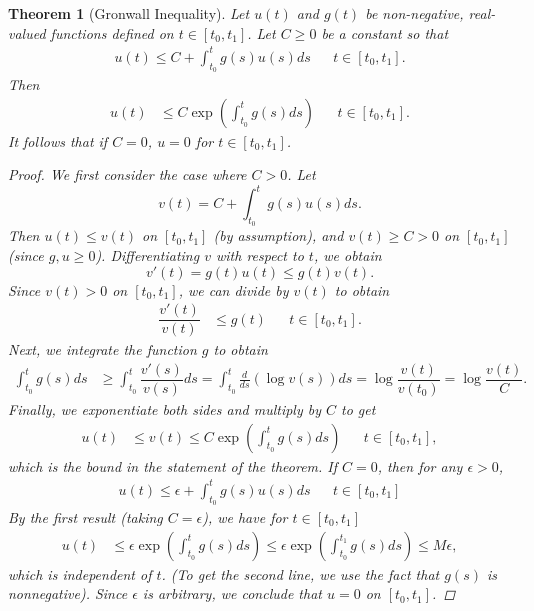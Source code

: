 \documentclass[12pt]{amsart}         %
\newtheorem{theorem}{Theorem}[section]
\theoremstyle{remark}
\begin{document}
\begin{theorem}[Gronwall Inequality]
Let $u(t)$ and $g(t)$ be non-negative, real-valued functions defined on $t \in [t_0, t_1]$. Let $C \geq 0$ be a constant so that
\begin{align*}
u(t) \leq C + \int_{t_0}^t g(s) u(s) ds && t \in [t_0, t_1].
\end{align*}
Then
\begin{align*}
u(t) &\leq C \exp \left( \int_{t_0}^t g(s) ds \right) && t \in [t_0, t_1].
\end{align*}
It follows that if $C = 0$, $u = 0$ for $t \in [t_0, t_1]$.
\begin{proof}
We first consider the case where $C > 0$. Let
\[
v(t) = C + \int_{t_0}^t g(s) u(s) ds.
\]
Then $u(t) \leq v(t)$ on $[t_0, t_1]$ (by assumption), and $v(t) \geq C > 0$ on $[t_0, t_1]$ (since $g, u \geq 0$). Differentiating $v$ with respect to $t$, we obtain
\[
v'(t) = g(t) u(t) \leq g(t)v(t).
\] 
Since $v(t) > 0$ on $[t_0, t_1]$, we can divide by $v(t)$ to obtain
\begin{align*}
\dfrac{v'(t)}{v(t)} &\leq g(t) && t \in [t_0, t_1].
\end{align*}
Next, we integrate the function $g$ to obtain
\begin{align*}
\int_{t_0}^t g(s) ds &\geq \int_{t_0}^t \dfrac{v'(s)}{v(s)} ds
= \int_{t_0}^t \frac{d}{ds}\left( \log {v(s)} \right) ds
= \log\dfrac{v(t)}{v(t_0)}
= \log\dfrac{v(t)}{C}.
\end{align*}
Finally, we exponentiate both sides and multiply by $C$ to get
\begin{align*}
u(t) &\leq v(t) \leq C \exp \left( \int_{t_0}^t g(s) ds \right) && t \in [t_0, t_1],
\end{align*}
which is the bound in the statement of the theorem.
If $C = 0$, then for any $\epsilon > 0$,
\begin{align*}
u(t) \leq \epsilon + \int_{t_0}^t g(s) u(s) ds && t \in [t_0, t_1]
\end{align*}
By the first result (taking $C = \epsilon$), we have for $t \in [t_0, t_1]$
\begin{align*}
u(t) &\leq \epsilon \exp \left( \int_{t_0}^t g(s) ds \right) \leq \epsilon \exp \left( \int_{t_0}^{t_1} g(s) ds \right) \leq M \epsilon,
\end{align*}
which is independent of $t$. (To get the second line, we use the fact that $g(s)$ is nonnegative). Since $\epsilon$ is arbitrary, we conclude that $u = 0$ on $[t_0, t_1]$.
\end{proof}
\end{theorem}
\end{document}
